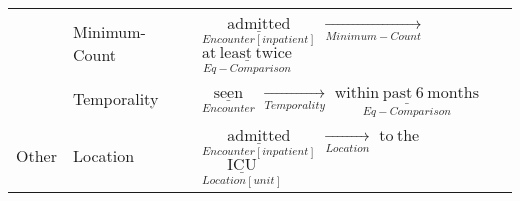 \begin{tabular}{m{3.8cm} m{2.2cm} m{10cm}}
         & Minimum-Count & $\underset{Encounter[inpatient]}{\underline{\mathrm{admitted}}}$ \quad $\xrightarrow[Minimum-Count]{}$ \quad $\underset{Eq-Comparison}{\underline{\mathrm{at\ least\ twice}}}$ \\    
        
         & Temporality & $\underset{Encounter}{\underline{\mathrm{seen}}}$ \quad $\xrightarrow[Temporality]{}$ \quad $\underset{Eq-Comparison}{\underline{\mathrm{within\ past\ 6\ months}}}$ \\[2ex]
         
    \hline
    
    Other &
         Location & $\underset{Encounter[inpatient]}{\underline{\mathrm{admitted}}}$ \quad $\xrightarrow[Location]{}$ \quad $\mathrm{to\ the}$ \quad $\underset{Location[unit]}{\underline{\mathrm{ICU}}}$ \\[2ex]
    
\end{tabular}